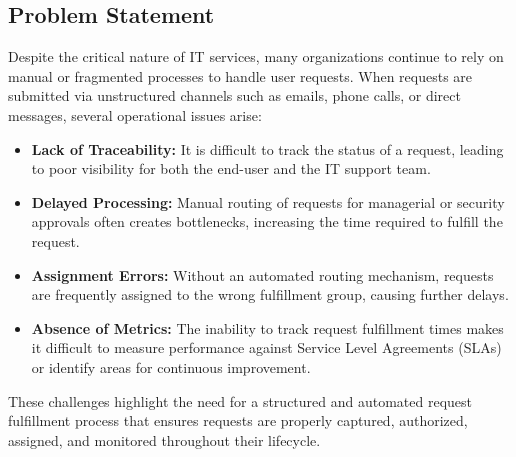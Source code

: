 \documentclass[12pt,a4paper]{report}
\begin{document}
\subsection{Problem Statement}
Despite the critical nature of IT services, many organizations continue to rely
on manual or fragmented processes to handle user requests. When requests are
submitted via unstructured channels such as emails, phone calls, or direct
messages, several operational issues arise:

\begin{itemize}

    \item \textbf{Lack of Traceability:} It is difficult to track the status of
    a request, leading to poor visibility for both the end-user and the IT
    support team.

    \item \textbf{Delayed Processing:} Manual routing of requests for
    managerial or security approvals often creates bottlenecks, increasing
    the time required to fulfill the request.

    \item \textbf{Assignment Errors:} Without an automated routing mechanism,
    requests are frequently assigned to the wrong fulfillment group, causing
    further delays.

    \item \textbf{Absence of Metrics:} The inability to track request
    fulfillment times makes it difficult to measure performance against
    Service Level Agreements (SLAs) or identify areas for continuous
    improvement.

\end{itemize}

These challenges highlight the need for a structured and automated request
fulfillment process that ensures requests are properly captured, authorized,
assigned, and monitored throughout their lifecycle.
\end{document}
